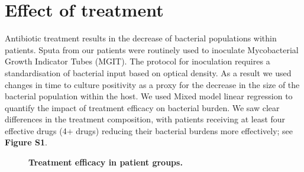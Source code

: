 \documentclass[12pt, oneside]{article}   	%
\begin{document}
\newpage

\section{Effect of treatment}
Antibiotic treatment results in the decrease of bacterial populations within patients. Sputa from our patients were routinely used to inoculate Mycobacterial Growth Indicator Tubes (MGIT). The protocol for inoculation requires a standardisation of bacterial input based on optical density. As a result we used changes in time to culture positivity as a proxy for the decrease in the size of the bacterial population within the host. We used Mixed model linear regression to quantify the impact of treatment efficacy on bacterial burden. We saw clear differences in the treatment composition, with patients receiving at least four effective drugs (4+ drugs) reducing their bacterial burdens more effectively; see \textbf{Figure S1}.

\begin{figure}
\label{fig:supfig1}
\centering
{}
\caption{\textbf{Treatment efficacy in patient groups.}}
\end{figure}
\end{document}
